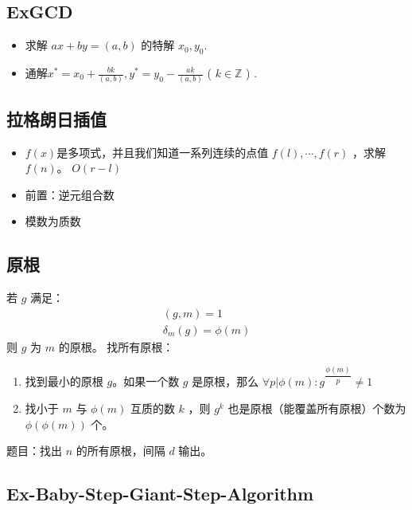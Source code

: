 \subsection{ExGCD}
\begin{itemize}
    \item 求解 $ax+by=(a,b)$ 的特解 $x_0, y_0$.
    \item 通解$x^* = x_0+\frac{bk}{(a,b)}, y^* = y_0-\frac{ak}{(a,b)}$ ( $k \in \mathbb{Z}$ ) .
\end{itemize}

\subsection{拉格朗日插值}
\begin{itemize}
    \item $f(x)$是多项式，并且我们知道一系列连续的点值 $f(l),\cdots,f(r)$ ，求解 $f(n)$。 $O(r-l)$
    \item 前置：逆元组合数
    \item 模数为质数
\end{itemize}


\subsection{原根} %
若 $g$ 满足：
\begin{equation*}
    \begin{aligned}
        (g,m)=1\\
        \delta_m(g)=\phi(m)
    \end{aligned}
\end{equation*}
则 $g$ 为 $m$ 的原根。
找所有原根：
\begin{enumerate}
    \item 找到最小的原根 $g$。如果一个数 $g$ 是原根，那么 $\forall p|\phi(m):g^{\dfrac{\phi(m)}{p}}\neq1$
    \item 找小于 $m$ 与 $\phi(m)$ 互质的数 $k$ ，则 $g^k$ 也是原根（能覆盖所有原根）个数为 $\phi(\phi(m))$ 个。
\end{enumerate}
题目：找出 $n$ 的所有原根，间隔 $d$ 输出。


\subsection{Ex-Baby-Step-Giant-Step-Algorithm}

